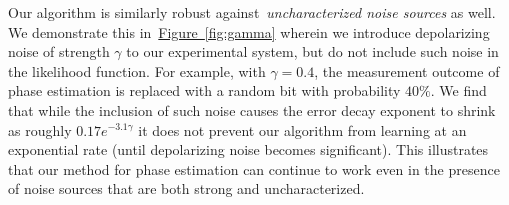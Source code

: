 \documentclass[aps,pra,amsmath,twocolumn,amssymb,superscriptaddress]{revtex4-1}
\newcommand{\fig}[1]{\hyperref[fig:#1]{Figure~\ref*{fig:#1}}}
\begin{document}
Our algorithm is similarly robust against~\emph{uncharacterized noise sources} as well.  We demonstrate this in~\fig{gamma} wherein we introduce depolarizing noise of strength $\gamma$ to our experimental system, but do not include such noise in the likelihood function.  For example, with $\gamma=0.4$, the measurement outcome of phase estimation is replaced with a random bit with probability $40\%$.  We find that while the inclusion of such noise causes the error decay exponent to shrink as roughly $0.17e^{-3.1\gamma}$ it does not prevent our algorithm from learning at an exponential rate (until depolarizing noise becomes significant).  This illustrates that our method for phase estimation can continue to work even in the presence of noise sources that are both strong and uncharacterized.
\end{document}

